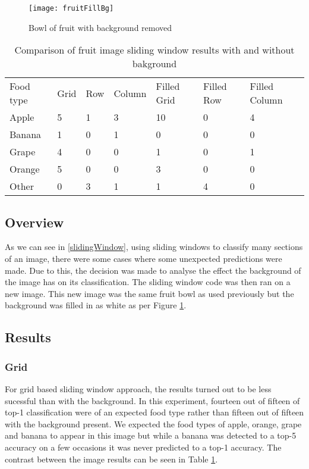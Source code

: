 \begin{figure}
    \texttt{[image: fruitFillBg]}
    \caption{Bowl of fruit with background removed}
    \label{fig:filledFruit}
\end{figure}

\begin{table}[]
    \centering
    \caption{Comparison of fruit image sliding window results with and without
    bakground}
    \label{comparisionFruitTable}
    \begin{tabular}{lllllll}
        Food type & Grid & Row & Column & Filled Grid & Filled Row & Filled
        Column \\
        Apple     & 5    & 1   & 3      & 10          & 0          & 4
        \\
        Banana    & 1    & 0   & 1      & 0           & 0          & 0
        \\
        Grape     & 4    & 0   & 0      & 1           & 0          & 1
        \\
        Orange    & 5    & 0   & 0      & 3           & 0          & 0
        \\
        Other     & 0    & 3   & 1      & 1           & 4          & 0            
    \end{tabular}
\end{table}

\subsection*{Overview}
As we can see in \ref{slidingWindow}, using sliding windows to classify many sections
of an image, there were some cases where some unexpected predictions were made.
Due to this, the decision was made to analyse the effect the background of the
image has on its classification. The sliding window code was then ran on a new
image. This new image was the same fruit bowl as used previously but the
background was filled in as white as per Figure \ref{fig:filledFruit}.

\subsection*{Results}
\subsubsection*{Grid}
For grid based sliding window approach, the results turned out to be less
sucessful than with the background. In this experiment, fourteen out of fifteen
of top-1 classification were of an expected food type rather than fifteen out of
fifteen with the background present. We expected the food types of apple,
orange, grape and banana to appear in this image but while a banana was detected
to a top-5 accuracy on a few occasions it was never predicted to a top-1
accuracy. The contrast between the image results can be seen in Table
\ref{comparisionFruitTable}.

